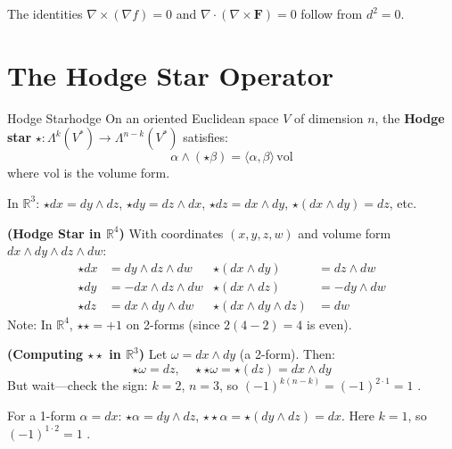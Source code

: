 \documentclass[11pt, letterpaper, openany]{book}
\begin{document}
The identities $\nabla \times (\nabla f) = 0$ and $\nabla \cdot (\nabla \times \mathbf{F}) = 0$ follow from $d^2 = 0$.

\section{The Hodge Star Operator}

\begin{defn}{Hodge Star}{hodge}
On an oriented Euclidean space $V$ of dimension $n$, the \textbf{Hodge star} $\star: \Lambda^k(V^*) \to \Lambda^{n-k}(V^*)$ satisfies:
\[
\alpha \wedge (\star\beta) = \langle \alpha, \beta \rangle \, \text{vol}
\]
where $\text{vol}$ is the volume form.
\end{defn}

\begin{example}
In $\mathbb{R}^3$: $\star dx = dy \wedge dz$, $\star dy = dz \wedge dx$, $\star dz = dx \wedge dy$, $\star(dx \wedge dy) = dz$, etc.
\end{example}

\begin{example}
\textbf{(Hodge Star in $\mathbb{R}^4$)}
With coordinates $(x, y, z, w)$ and volume form $dx \wedge dy \wedge dz \wedge dw$:
\begin{align*}
\star dx &= dy \wedge dz \wedge dw & \star(dx \wedge dy) &= dz \wedge dw \\
\star dy &= -dx \wedge dz \wedge dw & \star(dx \wedge dz) &= -dy \wedge dw \\
\star dz &= dx \wedge dy \wedge dw & \star(dx \wedge dy \wedge dz) &= dw
\end{align*}
Note: In $\mathbb{R}^4$, $\star\star = +1$ on 2-forms (since $2(4-2) = 4$ is even).
\end{example}

\begin{example}
\textbf{(Computing $\star\star$ in $\mathbb{R}^3$)}
Let $\omega = dx \wedge dy$ (a 2-form). Then:
\[\star\omega = dz, \quad \star\star\omega = \star(dz) = dx \wedge dy\]
But wait---check the sign: $k = 2$, $n = 3$, so $(-1)^{k(n-k)} = (-1)^{2 \cdot 1} = 1$ \checkmark.

For a 1-form $\alpha = dx$: $\star\alpha = dy \wedge dz$, $\star\star\alpha = \star(dy \wedge dz) = dx$.
Here $k = 1$, so $(-1)^{1 \cdot 2} = 1$ \checkmark.
\end{example}
\end{document}
